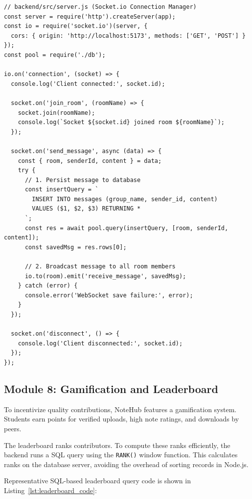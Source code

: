 \documentclass[12,Times new Roman,a4paper]{report}
\begin{document}
\begin{verbatim}
// backend/src/server.js (Socket.io Connection Manager)
const server = require('http').createServer(app);
const io = require('socket.io')(server, {
  cors: { origin: 'http://localhost:5173', methods: ['GET', 'POST'] }
});
const pool = require('./db');

io.on('connection', (socket) => {
  console.log('Client connected:', socket.id);

  socket.on('join_room', (roomName) => {
    socket.join(roomName);
    console.log(`Socket ${socket.id} joined room ${roomName}`);
  });

  socket.on('send_message', async (data) => {
    const { room, senderId, content } = data;
    try {
      // 1. Persist message to database
      const insertQuery = `
        INSERT INTO messages (group_name, sender_id, content) 
        VALUES ($1, $2, $3) RETURNING *
      `;
      const res = await pool.query(insertQuery, [room, senderId, content]);
      const savedMsg = res.rows[0];

      // 2. Broadcast message to all room members
      io.to(room).emit('receive_message', savedMsg);
    } catch (error) {
      console.error('WebSocket save failure:', error);
    }
  });

  socket.on('disconnect', () => {
    console.log('Client disconnected:', socket.id);
  });
});
\end{verbatim}
\label{lst:socket_code}

\subsection{Module 8: Gamification and Leaderboard}

To incentivize quality contributions, NoteHub features a gamification system. Students earn points for verified uploads, high note ratings, and downloads by peers. 

The leaderboard ranks contributors. To compute these ranks efficiently, the backend runs a SQL query using the \texttt{RANK()} window function. This calculates ranks on the database server, avoiding the overhead of sorting records in Node.js.

Representative SQL-based leaderboard query code is shown in Listing~\ref{lst:leaderboard_code}:
\end{document}
